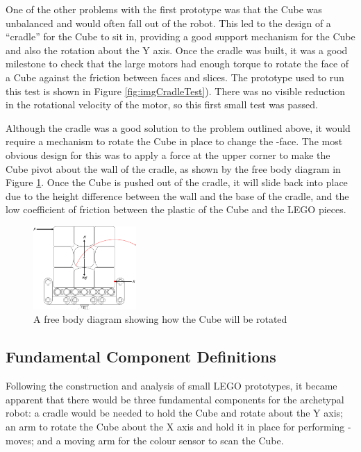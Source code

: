 \documentclass{report}
\newcommand{\face}[1]{\uppercase{\texttt{\formatmovesnospace{#1}}}-face}
\newcommand{\move}[1]{\uppercase{\texttt{\formatmovesnospace{#1}}}-move}
\newcommand{\lego}{LEGO }
\begin{document}
	One of the other problems with the first prototype was that the Cube was unbalanced and would often fall out of the robot. This led to the design of a \enquote{cradle} for the Cube to sit in, providing a good support mechanism for the Cube and also the rotation about the Y axis. Once the cradle was built, it was a good milestone to check that the large motors had enough torque to rotate the face of a Cube against the friction between faces and slices. The prototype used to run this test is shown in Figure \ref{fig:imgCradleTest}). There was no visible reduction in the rotational velocity of the motor, so this first small test was passed.
	
	Although the cradle was a good solution to the problem outlined above, it would require a mechanism to rotate the Cube in place to change the \face{d}. The most obvious design for this was to apply a force at the upper corner to make the Cube pivot about the wall of the cradle, as shown by the free body diagram in Figure \ref{fig:dwgCubeFreeBodyDiagram}. Once the Cube is pushed out of the cradle, it will slide back into place due to the height difference between the wall and the base of the cradle, and the low coefficient of friction between the plastic of the Cube and the \lego pieces.
    
	\begin{figure}[H]
    	\centering
   		\includegraphics[width=0.35\textwidth]{Resources/Images/dwgCubeFreeBodyDiagram.png}
   		\caption{A free body diagram showing how the Cube will be rotated}
   		\label{fig:dwgCubeFreeBodyDiagram}
    \end{figure}
    
    \subsection{Fundamental Component Definitions} \label{sec:componentDefinitions}
    
    Following the construction and analysis of small \lego prototypes, it became apparent that there would be three fundamental components for the archetypal robot: a cradle would be needed to hold the Cube and rotate about the Y axis; an arm to rotate the Cube about the X axis and hold it in place for performing \move{d}s; and a moving arm for the colour sensor to scan the Cube.
    
\end{document}
